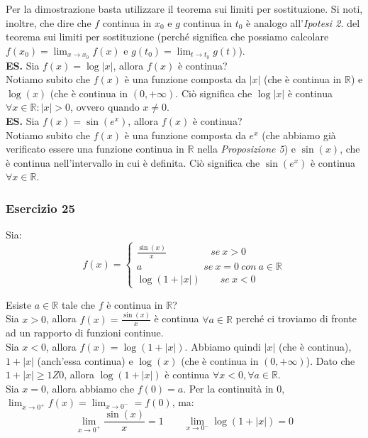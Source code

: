 \documentclass{article}
\begin{document}
\noindent Per la dimostrazione basta utilizzare il teorema sui limiti per sostituzione. Si noti, inoltre, che dire che $f$ continua in $x_0$ e $g$ continua in $t_0$ è analogo all'\textit{Ipotesi 2.} del teorema sui limiti per sostituzione (perché significa che possiamo calcolare $f(x_0) = \lim_{x \to x_0} f(x)$ e $g(t_0) = \lim_{t \to t_0} g(t)$). \\

\noindent\textbf{ES.} Sia $f(x) = \log|x|$, allora $f(x)$ è continua? \\
\noindent Notiamo subito che $f(x)$ è una funzione composta da $|x|$ (che è continua in $\mathbb{R}$) e $\log(x)$ (che è continua in $(0, +\infty)$. Ciò significa che $\log|x|$ è continua $\forall x \in \mathbb{R} : |x| > 0$, ovvero quando $x \neq 0$.\\

\noindent\textbf{ES.} Sia $f(x) = \sin(e^x)$, allora $f(x)$ è continua?\\
\noindent Notiamo subito che $f(x)$ è una funzione composta da $e^x$ (che abbiamo già verificato essere una funzione continua in $\mathbb{R}$ nella \textit{Proposizione 5}) e $\sin(x)$, che è continua nell'intervallo in cui è definita. Ciò significa che $\sin(e^x)$ è continua $\forall x \in \mathbb{R}$.

\subsubsection{Esercizio 25}
Sia:
\begin{equation*}
    f(x) = \begin{cases}
        \frac{\sin(x)}{x} \qquad \qquad \ \ se \ x > 0 \\
        a \qquad \qquad \qquad \ se \ x = 0 \ con \ a \in \mathbb{R} \\
        \log(1 + |x|) \qquad se \ x < 0
    \end{cases}
\end{equation*}

\noindent Esiste $a \in \mathbb{R}$ tale che $f$ è continua in $\mathbb{R}$?\\

\noindent Sia $x > 0$, allora $f(x) = \frac{\sin(x)}{x}$ è continua $\forall a \in \mathbb{R}$ perché ci troviamo di fronte ad un rapporto di funzioni continue. \\
\noindent Sia $x < 0$, allora $f(x) = \log(1 + |x|)$. Abbiamo quindi $|x|$ (che è continua), $1 + |x|$ (anch'essa continua) e $\log(x)$ (che è continua in $(0, +\infty)$). Dato che $1 + |x| \geq 1 Z 0$, allora $\log(1 + |x|)$ è continua $\forall x < 0, \forall a \in \mathbb{R}$.\\
\noindent Sia $x = 0$, allora abbiamo che $f(0) = a$. Per la continuità in $0$, $\lim_{x \to 0^+} f(x) = \lim_{x \to 0^-} = f(0)$, ma:
\begin{equation*}
    \lim_{x \to 0^+} \frac{\sin(x)}{x} = 1 \qquad \lim_{x \to 0^-} \log(1 + |x|) = 0
\end{equation*}
\end{document}
